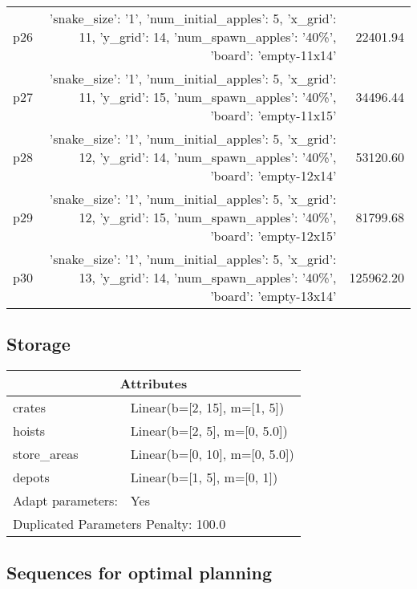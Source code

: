 \documentclass{article}
\begin{document}
\begin{center}
\begin{tabular}{@{}l|r|r@{}}
  p26&{'snake\_size': '1', 'num\_initial\_apples': 5, 'x\_grid': 11, 'y\_grid': 14, 'num\_spawn\_apples': '40\%', 'board': 'empty-11x14'}&22401.94\\
  p27&{'snake\_size': '1', 'num\_initial\_apples': 5, 'x\_grid': 11, 'y\_grid': 15, 'num\_spawn\_apples': '40\%', 'board': 'empty-11x15'}&34496.44\\
  p28&{'snake\_size': '1', 'num\_initial\_apples': 5, 'x\_grid': 12, 'y\_grid': 14, 'num\_spawn\_apples': '40\%', 'board': 'empty-12x14'}&53120.60\\
  p29&{'snake\_size': '1', 'num\_initial\_apples': 5, 'x\_grid': 12, 'y\_grid': 15, 'num\_spawn\_apples': '40\%', 'board': 'empty-12x15'}&81799.68\\
  p30&{'snake\_size': '1', 'num\_initial\_apples': 5, 'x\_grid': 13, 'y\_grid': 14, 'num\_spawn\_apples': '40\%', 'board': 'empty-13x14'}&125962.20
                            \end{tabular}
                            \end{center}
                    
                            \newpage \subsection{Storage}
                    \begin{center}
                    \begin{tabular}{@{}p{}p{}@{}}
                    \multicolumn{2}{c}{\bf \large Attributes}\\\midrule
                    crates & Linear(b=[2, 15], m=[1, 5])\\
hoists & Linear(b=[2, 5], m=[0, 5.0])\\
store\_areas & Linear(b=[0, 10], m=[0, 5.0])\\
depots & Linear(b=[1, 5], m=[0, 1])
                    \\\midrule
                    Adapt parameters: & Yes \\\midrule
                    \multicolumn{2}{l}{Duplicated Parameters Penalty: 100.0}
                    \end{tabular}
                    \end{center}
                
                            \subsection*{Sequences for optimal planning}
\end{document}
